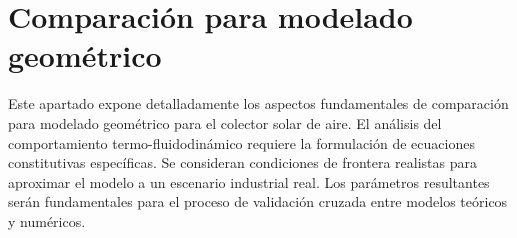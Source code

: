 \section{Comparación para modelado geométrico}
\label{sec:cap08_modelado}

Este apartado expone detalladamente los aspectos fundamentales de comparación para modelado geométrico para el colector solar de aire.
El análisis del comportamiento termo-fluidodinámico requiere la formulación de ecuaciones constitutivas específicas.
Se consideran condiciones de frontera realistas para aproximar el modelo a un escenario industrial real.
Los parámetros resultantes serán fundamentales para el proceso de validación cruzada entre modelos teóricos y numéricos.
